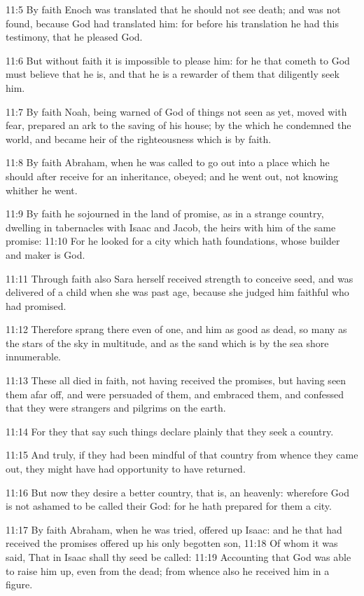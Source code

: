 11:5 By faith Enoch was translated that he should not see death; and was not found, because God had translated him: for before his translation he had this testimony, that he pleased God.

11:6 But without faith it is impossible to please him: for he that cometh to God must believe that he is, and that he is a rewarder of them that diligently seek him.

11:7 By faith Noah, being warned of God of things not seen as yet, moved with fear, prepared an ark to the saving of his house; by the which he condemned the world, and became heir of the righteousness which is by faith.

11:8 By faith Abraham, when he was called to go out into a place which he should after receive for an inheritance, obeyed; and he went out, not knowing whither he went.

11:9 By faith he sojourned in the land of promise, as in a strange country, dwelling in tabernacles with Isaac and Jacob, the heirs with him of the same promise: 11:10 For he looked for a city which hath foundations, whose builder and maker is God.

11:11 Through faith also Sara herself received strength to conceive seed, and was delivered of a child when she was past age, because she judged him faithful who had promised.

11:12 Therefore sprang there even of one, and him as good as dead, so many as the stars of the sky in multitude, and as the sand which is by the sea shore innumerable.

11:13 These all died in faith, not having received the promises, but having seen them afar off, and were persuaded of them, and embraced them, and confessed that they were strangers and pilgrims on the earth.

11:14 For they that say such things declare plainly that they seek a country.

11:15 And truly, if they had been mindful of that country from whence they came out, they might have had opportunity to have returned.

11:16 But now they desire a better country, that is, an heavenly: wherefore God is not ashamed to be called their God: for he hath prepared for them a city.

11:17 By faith Abraham, when he was tried, offered up Isaac: and he that had received the promises offered up his only begotten son, 11:18 Of whom it was said, That in Isaac shall thy seed be called: 11:19 Accounting that God was able to raise him up, even from the dead; from whence also he received him in a figure.

